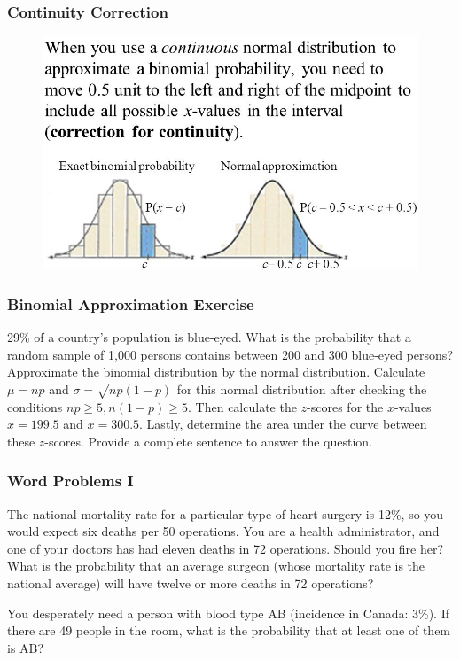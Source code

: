 \documentclass[xcolor=dvipsnames]{beamer}
\begin{document}
\begin{frame}
  \frametitle{Continuity Correction}
  \begin{figure}[h]
    \includegraphics[scale=.5]{./diagrams/contcorr_ed1.jpg}
  \end{figure}
\end{frame}

\begin{frame}
  \frametitle{Binomial Approximation Exercise}
{\ubung} 29\% of a country's population is blue-eyed. What is the
probability that a random sample of 1,000 persons contains between 200
and 300 blue-eyed persons? Approximate the binomial distribution by
the normal distribution. Calculate $\mu=np$ and
$\sigma=\sqrt{np(1-p)}$ for this normal distribution after checking
the conditions $np\geq{}5,n(1-p)\geq{}5$. Then calculate the
$z$-scores for the $x$-values $x=199.5$ and $x=300.5$. Lastly,
determine the area under the curve between these $z$-scores. Provide a
complete sentence to answer the question.
\end{frame}

\begin{frame}
  \frametitle{Word Problems I}
The national mortality rate for a particular type of heart surgery
is 12\%, so you would expect six deaths per 50 operations. You are a
health administrator, and one of your doctors has had eleven deaths in
72 operations. Should you fire her? What is the probability that an
average surgeon (whose mortality rate is the national average) will
have twelve or more deaths in 72 operations?

\bigskip

You desperately need a person with blood type AB (incidence in
Canada: 3\%). If there are 49 people in the room, what is the
probability that at least one of them is AB?
\end{frame}
\end{document}
